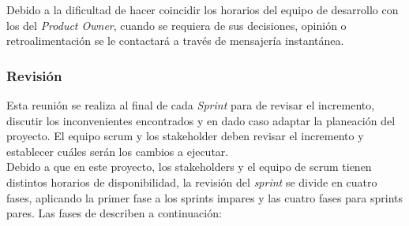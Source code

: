      
   
    
 \noindent Debido a la dificultad de hacer coincidir los horarios del equipo de desarrollo  con los
 del {\it Product Owner}, cuando se requiera de sus decisiones, opinión o retroalimentación se le contactará
 a través de mensajería instantánea.
    
\subsubsection{Revisión}

 Esta reunión se realiza al final de cada {\it Sprint} para de revisar el incremento, discutir los inconvenientes
 encontrados y en dado caso adaptar la planeación del proyecto. El equipo scrum y los stakeholder deben
 revisar el incremento y establecer cuáles serán los cambios a ejecutar.\\

 \noindent Debido a que en este proyecto, los stakeholders y el equipo de scrum tienen distintos horarios
 de disponibilidad, la revisión del {\it sprint} se divide en cuatro fases, aplicando la primer fase a los sprints
 impares y las cuatro fases para sprints pares. Las fases de describen a continuación:
 
